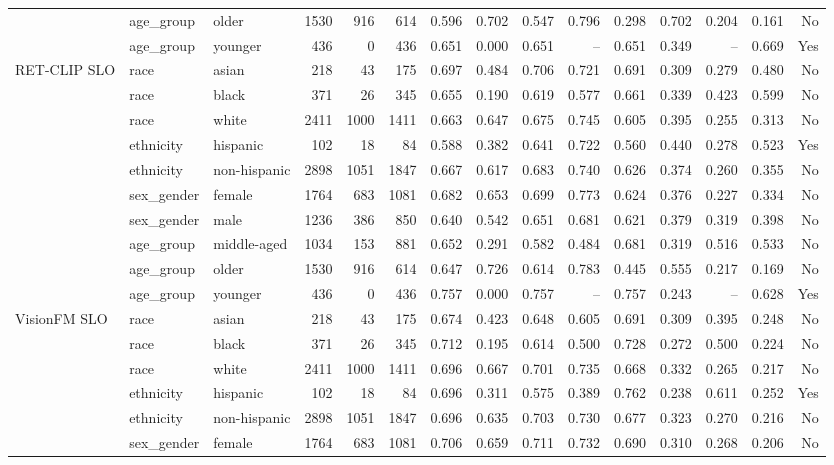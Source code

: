 \begin{longtable}{@{}lllrrrrrrrrrrrr@{}}
 & age\_group & older & 1530 & 916 & 614 & 0.596 & 0.702 & 0.547 & 0.796 & 0.298 & 0.702 & 0.204 & 0.161 & No \\
 & age\_group & younger & 436 & 0 & 436 & 0.651 & 0.000 & 0.651 & -- & 0.651 & 0.349 & -- & 0.669 & Yes \\
RET-CLIP SLO & race & asian & 218 & 43 & 175 & 0.697 & 0.484 & 0.706 & 0.721 & 0.691 & 0.309 & 0.279 & 0.480 & No \\
 & race & black & 371 & 26 & 345 & 0.655 & 0.190 & 0.619 & 0.577 & 0.661 & 0.339 & 0.423 & 0.599 & No \\
 & race & white & 2411 & 1000 & 1411 & 0.663 & 0.647 & 0.675 & 0.745 & 0.605 & 0.395 & 0.255 & 0.313 & No \\
 & ethnicity & hispanic & 102 & 18 & 84 & 0.588 & 0.382 & 0.641 & 0.722 & 0.560 & 0.440 & 0.278 & 0.523 & Yes \\
 & ethnicity & non-hispanic & 2898 & 1051 & 1847 & 0.667 & 0.617 & 0.683 & 0.740 & 0.626 & 0.374 & 0.260 & 0.355 & No \\
 & sex\_gender & female & 1764 & 683 & 1081 & 0.682 & 0.653 & 0.699 & 0.773 & 0.624 & 0.376 & 0.227 & 0.334 & No \\
 & sex\_gender & male & 1236 & 386 & 850 & 0.640 & 0.542 & 0.651 & 0.681 & 0.621 & 0.379 & 0.319 & 0.398 & No \\
 & age\_group & middle-aged & 1034 & 153 & 881 & 0.652 & 0.291 & 0.582 & 0.484 & 0.681 & 0.319 & 0.516 & 0.533 & No \\
 & age\_group & older & 1530 & 916 & 614 & 0.647 & 0.726 & 0.614 & 0.783 & 0.445 & 0.555 & 0.217 & 0.169 & No \\
 & age\_group & younger & 436 & 0 & 436 & 0.757 & 0.000 & 0.757 & -- & 0.757 & 0.243 & -- & 0.628 & Yes \\
VisionFM SLO & race & asian & 218 & 43 & 175 & 0.674 & 0.423 & 0.648 & 0.605 & 0.691 & 0.309 & 0.395 & 0.248 & No \\
 & race & black & 371 & 26 & 345 & 0.712 & 0.195 & 0.614 & 0.500 & 0.728 & 0.272 & 0.500 & 0.224 & No \\
 & race & white & 2411 & 1000 & 1411 & 0.696 & 0.667 & 0.701 & 0.735 & 0.668 & 0.332 & 0.265 & 0.217 & No \\
 & ethnicity & hispanic & 102 & 18 & 84 & 0.696 & 0.311 & 0.575 & 0.389 & 0.762 & 0.238 & 0.611 & 0.252 & Yes \\
 & ethnicity & non-hispanic & 2898 & 1051 & 1847 & 0.696 & 0.635 & 0.703 & 0.730 & 0.677 & 0.323 & 0.270 & 0.216 & No \\
 & sex\_gender & female & 1764 & 683 & 1081 & 0.706 & 0.659 & 0.711 & 0.732 & 0.690 & 0.310 & 0.268 & 0.206 & No \\

\end{longtable}
